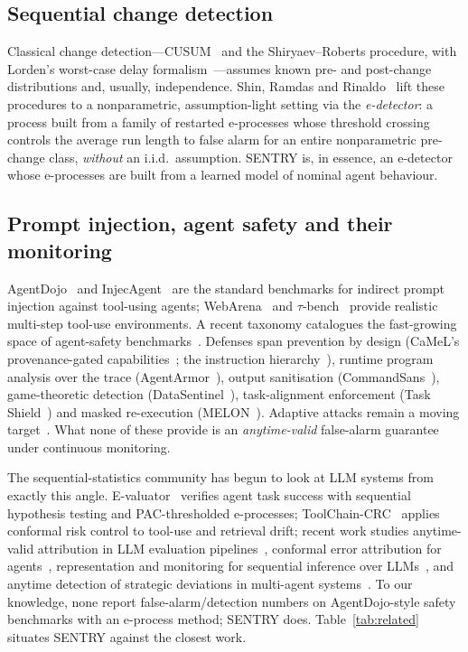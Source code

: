 \documentclass[pdflatex,sn-mathphys-num]{sn-jnl}%
\theoremstyle{thmstyleone}%
\theoremstyle{thmstyletwo}%
\theoremstyle{thmstylethree}%
\begin{document}
\subsection{Sequential change detection}

Classical change detection---CUSUM~\cite{page1954cusum} and the
Shiryaev--Roberts procedure, with Lorden's worst-case delay
formalism~\cite{lorden1971procedures}---assumes known pre- and post-change
distributions and, usually, independence. Shin, Ramdas and
Rinaldo~\cite{shin2023edetectors} lift these procedures to a nonparametric,
assumption-light setting via the \emph{e-detector}: a process built from a
family of restarted e-processes whose threshold crossing controls the average
run length to false alarm for an entire nonparametric pre-change class,
\emph{without} an i.i.d.\ assumption. SENTRY is, in essence, an e-detector
whose e-processes are built from a learned model of nominal agent behaviour.

\subsection{Prompt injection, agent safety and their monitoring}

AgentDojo~\cite{debenedetti2024agentdojo} and
InjecAgent~\cite{zhan2024injecagent} are the standard benchmarks for indirect
prompt injection against tool-using agents; WebArena~\cite{zhou2023webarena}
and \(\tau\)-bench~\cite{yao2024taubench} provide realistic multi-step
tool-use environments. A recent taxonomy catalogues the fast-growing space of
agent-safety benchmarks~\cite{li2026taxonomy}. Defenses span prevention by
design (CaMeL's provenance-gated capabilities~\cite{debenedetti2025camel}; the
instruction hierarchy~\cite{wallace2024instructionhierarchy}), runtime
program analysis over the trace (AgentArmor~\cite{wang2025agentarmor}),
output sanitisation (CommandSans~\cite{das2025commandsans}), game-theoretic
detection (DataSentinel~\cite{liu2025datasentinel}), task-alignment
enforcement (Task Shield~\cite{jia2024taskshield}) and masked re-execution
(MELON~\cite{zhu2025melon}). Adaptive attacks remain a moving
target~\cite{nasr2025attackersecond}. What none of these provide is an
\emph{anytime-valid} false-alarm guarantee under continuous monitoring.

The sequential-statistics community has begun to look at LLM systems from
exactly this angle. E-valuator~\cite{sadhuka2025evaluator} verifies agent
task success with sequential hypothesis testing and PAC-thresholded
e-processes; ToolChain-CRC~\cite{opoku2026toolchain} applies conformal risk
control to tool-use and retrieval drift; recent work studies anytime-valid
attribution in LLM evaluation pipelines~\cite{li2026whodrifted}, conformal
error attribution for agents~\cite{feng2026conformalattribution},
representation and monitoring for sequential inference over
LLMs~\cite{xie2026sequential}, and anytime detection of strategic deviations
in multi-agent systems~\cite{gauthier2026strategic}. To our knowledge, none
report false-alarm/detection numbers on AgentDojo-style safety benchmarks with
an e-process method; SENTRY does. Table~\ref{tab:related} situates SENTRY
against the closest work.
\end{document}
